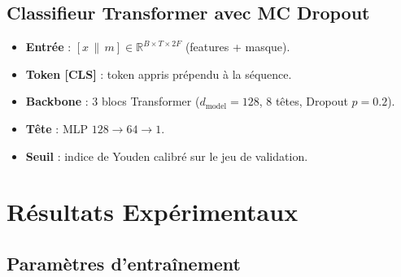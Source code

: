 \documentclass[11pt,a4paper]{article}
\begin{document}
\subsection{Classifieur Transformer avec MC Dropout}

\begin{itemize}
    \item \textbf{Entrée} : $[x \,\|\, m] \in \mathbb{R}^{B \times T \times 2F}$ (features + masque).
    \item \textbf{Token [CLS]} : token appris prépendu à la séquence.
    \item \textbf{Backbone} : 3 blocs Transformer ($d_\text{model}=128$, 8 têtes, Dropout $p=0.2$).
    \item \textbf{Tête} : MLP $128 \to 64 \to 1$.
    \item \textbf{Seuil} : indice de Youden calibré sur le jeu de validation.
\end{itemize}


\section{Résultats Expérimentaux}

\subsection{Paramètres d'entraînement}
\end{document}
